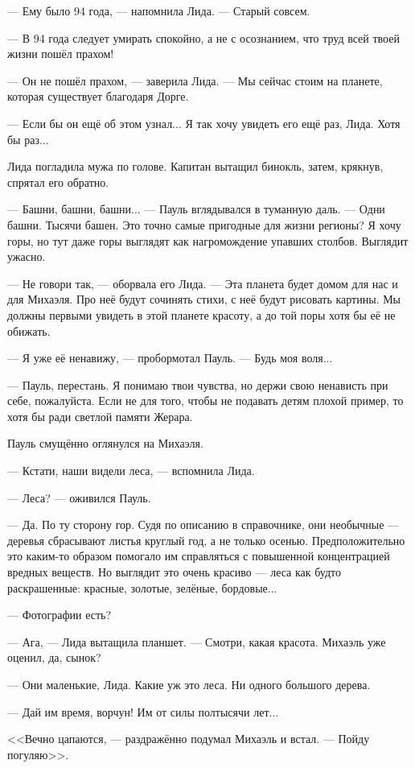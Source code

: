 \documentclass[a4paper,10pt,fleqn]{book}\usepackage{polyglossia}\setdefaultlanguage{english}\setotherlanguage{russian}\defaultfontfeatures{Ligatures=TeX,Mapping=tex-text}\usepackage{xcolor}\definecolor{lightgray}{HTML}{bbbbbb}\color{lightgray}\newcommand{\ml}[3]{\textcolor{black}{#3}}
\begin{document}
--- Ему было 94 года, --- напомнила Лида.
--- Старый совсем.

--- В 94 года следует умирать спокойно, а не с осознанием, что труд всей твоей жизни пошёл прахом!

--- Он не пошёл прахом, --- заверила Лида.
--- Мы сейчас стоим на планете, которая существует благодаря Дорге.

--- Если бы он ещё об этом узнал...
Я так хочу увидеть его ещё раз, Лида.
Хотя бы раз...

Лида погладила мужа по голове.
Капитан вытащил бинокль, затем, крякнув, спрятал его обратно.

--- Башни, башни, башни... --- Пауль вглядывался в туманную даль.
--- Одни башни.
Тысячи башен.
Это точно самые пригодные для жизни регионы?
Я хочу горы, но тут даже горы выглядят как нагромождение упавших столбов.
Выглядит ужасно.

--- Не говори так, --- оборвала его Лида.
--- Эта планета будет домом для нас и для Михаэля.
Про неё будут сочинять стихи, с неё будут рисовать картины.
Мы должны первыми увидеть в этой планете красоту, а до той поры хотя бы её не обижать.

--- Я уже её ненавижу, --- пробормотал Пауль.
--- Будь моя воля...

--- Пауль, перестань.
Я понимаю твои чувства, но держи свою ненависть при себе, пожалуйста.
Если не для того, чтобы не подавать детям плохой пример, то хотя бы ради светлой памяти Жерара.

Пауль смущённо оглянулся на Михаэля.

--- Кстати, наши видели леса, --- вспомнила Лида.

--- Леса? --- оживился Пауль.

--- Да.
По ту сторону гор.
Судя по описанию в справочнике, они необычные --- деревья сбрасывают листья круглый год, а не только осенью.
Предположительно это каким-то образом помогало им справляться с повышенной концентрацией вредных веществ.
Но выглядит это очень красиво --- леса как будто раскрашенные: красные, золотые, зелёные, бордовые...

--- Фотографии есть?

--- Ага, --- Лида вытащила планшет.
--- Смотри, какая красота.
Михаэль уже оценил, да, сынок?

--- Они маленькие, Лида.
Какие уж это леса.
Ни одного большого дерева.

--- Дай им время, ворчун!
Им от силы полтысячи лет...

<<Вечно цапаются, --- раздражённо подумал Михаэль и встал.
--- Пойду погуляю>>.
\end{document}
